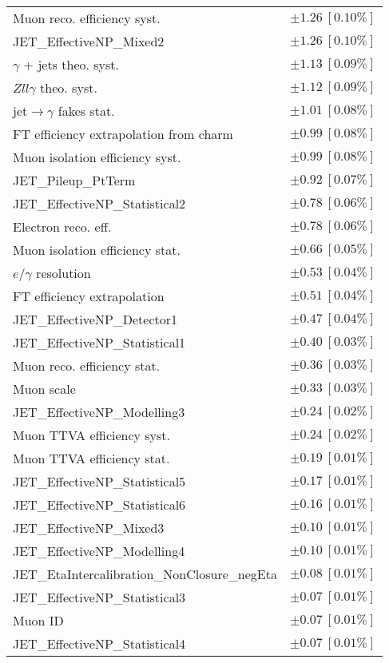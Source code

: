 \begin{tabular}{lr}
Muon reco. efficiency syst. & $\pm 1.26\ [0.10\%]$ \\
JET\_EffectiveNP\_Mixed2 & $\pm 1.26\ [0.10\%]$ \\
$\gamma$ + jets theo. syst. & $\pm 1.13\ [0.09\%]$ \\
$Zll\gamma$ theo. syst. & $\pm 1.12\ [0.09\%]$ \\
jet$\to\gamma$ fakes stat. & $\pm 1.01\ [0.08\%]$ \\
FT efficiency extrapolation from charm & $\pm 0.99\ [0.08\%]$ \\
Muon isolation efficiency syst. & $\pm 0.99\ [0.08\%]$ \\
JET\_Pileup\_PtTerm & $\pm 0.92\ [0.07\%]$ \\
JET\_EffectiveNP\_Statistical2 & $\pm 0.78\ [0.06\%]$ \\
Electron reco. eff. & $\pm 0.78\ [0.06\%]$ \\
Muon isolation efficiency stat. & $\pm 0.66\ [0.05\%]$ \\
$e/\gamma$ resolution & $\pm 0.53\ [0.04\%]$ \\
FT efficiency extrapolation & $\pm 0.51\ [0.04\%]$ \\
JET\_EffectiveNP\_Detector1 & $\pm 0.47\ [0.04\%]$ \\
JET\_EffectiveNP\_Statistical1 & $\pm 0.40\ [0.03\%]$ \\
Muon reco. efficiency stat. & $\pm 0.36\ [0.03\%]$ \\
Muon scale & $\pm 0.33\ [0.03\%]$ \\
JET\_EffectiveNP\_Modelling3 & $\pm 0.24\ [0.02\%]$ \\
Muon TTVA efficiency syst. & $\pm 0.24\ [0.02\%]$ \\
Muon TTVA efficiency stat. & $\pm 0.19\ [0.01\%]$ \\
JET\_EffectiveNP\_Statistical5 & $\pm 0.17\ [0.01\%]$ \\
JET\_EffectiveNP\_Statistical6 & $\pm 0.16\ [0.01\%]$ \\
JET\_EffectiveNP\_Mixed3 & $\pm 0.10\ [0.01\%]$ \\
JET\_EffectiveNP\_Modelling4 & $\pm 0.10\ [0.01\%]$ \\
JET\_EtaIntercalibration\_NonClosure\_negEta & $\pm 0.08\ [0.01\%]$ \\
JET\_EffectiveNP\_Statistical3 & $\pm 0.07\ [0.01\%]$ \\
Muon ID & $\pm 0.07\ [0.01\%]$ \\
JET\_EffectiveNP\_Statistical4 & $\pm 0.07\ [0.01\%]$ \\
\hline
\end{tabular}
